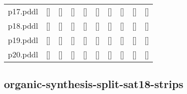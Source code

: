\documentclass{article}
\begin{document}
\begin{tabular}{@{}lrrrrrrrrr@{}}
p17.pddl & \multicolumn{1}{|l|}{[]} & \multicolumn{1}{|l|}{[]} & \multicolumn{1}{|l|}{[]} & \multicolumn{1}{|l|}{[]} & \multicolumn{1}{|l|}{[]} & \multicolumn{1}{|l|}{[]} & \multicolumn{1}{|l|}{[]} & \multicolumn{1}{|l|}{[]} & \multicolumn{1}{|l|}{[]} \\
p18.pddl & \multicolumn{1}{|l|}{[]} & \multicolumn{1}{|l|}{[]} & \multicolumn{1}{|l|}{[]} & \multicolumn{1}{|l|}{[]} & \multicolumn{1}{|l|}{[]} & \multicolumn{1}{|l|}{[]} & \multicolumn{1}{|l|}{[]} & \multicolumn{1}{|l|}{[]} & \multicolumn{1}{|l|}{[]} \\
p19.pddl & \multicolumn{1}{|l|}{[]} & \multicolumn{1}{|l|}{[]} & \multicolumn{1}{|l|}{[]} & \multicolumn{1}{|l|}{[]} & \multicolumn{1}{|l|}{[]} & \multicolumn{1}{|l|}{[]} & \multicolumn{1}{|l|}{[]} & \multicolumn{1}{|l|}{[]} & \multicolumn{1}{|l|}{[]} \\
p20.pddl & \multicolumn{1}{|l|}{[]} & \multicolumn{1}{|l|}{[]} & \multicolumn{1}{|l|}{[]} & \multicolumn{1}{|l|}{[]} & \multicolumn{1}{|l|}{[]} & \multicolumn{1}{|l|}{[]} & \multicolumn{1}{|l|}{[]} & \multicolumn{1}{|l|}{[]} & \multicolumn{1}{|l|}{[]} \\
\end{tabular}

\hypertarget{h_values-organic-synthesis-split-sat18-strips}{}
\subsection*{organic-synthesis-split-sat18-strips}
\end{document}
